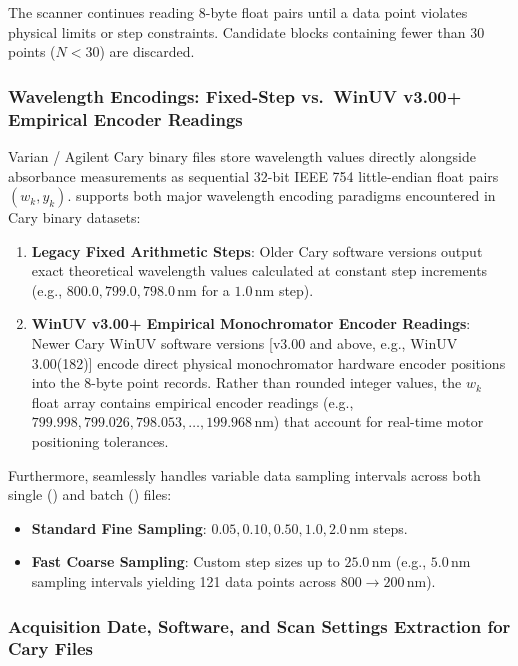 \documentclass[11pt,a4paper]{article}
\newcommand{\code}[1]{\texttt{\detokenize{#1}}}
\begin{document}
The scanner continues reading 8-byte float pairs until a data point violates physical limits or step constraints. Candidate blocks containing fewer than 30 points ($N < 30$) are discarded.

\subsubsection{Wavelength Encodings: Fixed-Step vs.\ WinUV v3.00+ Empirical Encoder Readings}

Varian / Agilent Cary binary files store wavelength values directly alongside absorbance measurements as sequential 32-bit IEEE 754 little-endian float pairs $(w_k, y_k)$. \code{parseUV} supports both major wavelength encoding paradigms encountered in Cary binary datasets:

\begin{enumerate}
  \item \textbf{Legacy Fixed Arithmetic Steps}: Older Cary software versions output exact theoretical wavelength values calculated at constant step increments (e.g., $800.0, 799.0, 798.0\,\text{nm}$ for a $1.0\,\text{nm}$ step).
  \item \textbf{WinUV v3.00+ Empirical Monochromator Encoder Readings}: Newer Cary WinUV software versions [v3.00 and above, e.g., WinUV 3.00(182)] encode direct physical monochromator hardware encoder positions into the 8-byte point records. Rather than rounded integer values, the $w_k$ float array contains empirical encoder readings (e.g., $799.998, 799.026, 798.053, \dots, 199.968\,\text{nm}$) that account for real-time motor positioning tolerances.
\end{enumerate}

Furthermore, \code{parseUV} seamlessly handles variable data sampling intervals across both single (\code{.DSW}) and batch (\code{.BSW}) files:
\begin{itemize}
  \item \textbf{Standard Fine Sampling}: $0.05, 0.10, 0.50, 1.0, 2.0\,\text{nm}$ steps.
  \item \textbf{Fast Coarse Sampling}: Custom step sizes up to $25.0\,\text{nm}$ (e.g., $5.0\,\text{nm}$ sampling intervals yielding 121 data points across $800 \to 200\,\text{nm}$).
\end{itemize}

\subsubsection{Acquisition Date, Software, and Scan Settings Extraction for Cary Files}
\end{document}
